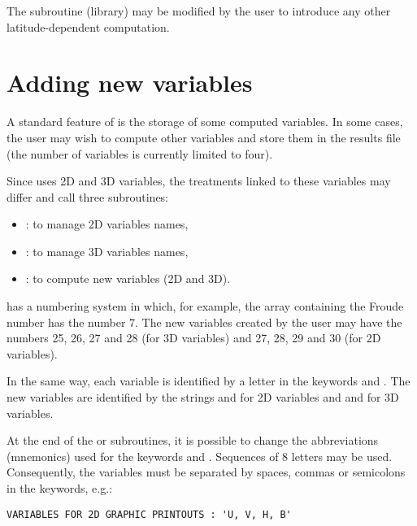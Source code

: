 The  subroutine (\bief library) may be modified by the user to introduce
any other latitude-dependent computation.


\section{Adding new variables}
\label{sec:privarray}
A standard feature of  is the storage of some computed variables.
In some cases, the user may wish to compute other variables and store them
in the results file (the number of variables is currently limited to four).

Since  uses 2D and 3D variables, the treatments linked to these
variables may differ and call three subroutines:

\begin{itemize}
\item  {}: to manage 2D variables names,

\item  {}: to manage 3D variables names,

\item  {}: to compute new variables (2D and 3D).
\end{itemize}

 has a numbering system in which, for example, the array containing
the Froude number has the number 7. The new variables created by the user may
have the numbers 25, 26, 27 and 28 (for 3D variables) and 27, 28, 29 and 30
(for 2D variables).

In the same way, each variable is identified by a letter in the keywords
 and
.
The new variables are identified by the strings 
and  for 2D variables and  and 
for 3D variables.

At the end of the  or 
subroutines, it is
possible to change the abbreviations (mnemonics) used for the keywords
 and . Sequences of 8 letters may be used.
Consequently, the variables must be separated by spaces, commas or
semicolons in the keywords, e.g.:

\begin{lstlisting}[language=TelemacCas]
VARIABLES FOR 2D GRAPHIC PRINTOUTS : 'U, V, H, B'
\end{lstlisting}

